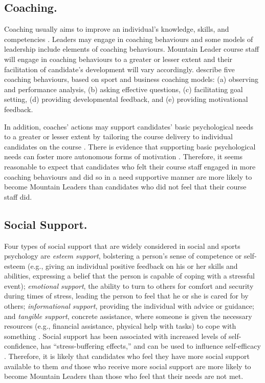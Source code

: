 \documentclass[
  12pt,
  a4paper,
]{book}
\begin{document}
\hypertarget{gen-intro-social-coaching}{%
\subsection{Coaching.}\label{gen-intro-social-coaching}}

Coaching usually aims to improve an individual's knowledge, skills, and competencies \citep{Wagstaff2018}. Leaders may engage in coaching behaviours and some models of leadership \citep[e.g., transformational leadership theory;][]{Bass1985} include elements of coaching behaviours. Mountain Leader course staff will engage in coaching behaviours to a greater or lesser extent and their facilitation of candidate's development will vary accordingly. \citet{Wagstaff2018} describe five coaching behaviours, based on sport and business coaching models: (a) observing and performance analysis, (b) asking effective questions, (c) facilitating goal setting, (d) providing developmental feedback, and (e) providing motivational feedback.

In addition, coaches' actions may support candidates' basic psychological needs to a greater or lesser extent by tailoring the course delivery to individual candidates on the course \citep{Arthur2019, Markland2010}. There is evidence that supporting basic psychological needs can foster more autonomous forms of motivation \citep{Markland2010, Silva2010}. Therefore, it seems reasonable to expect that candidates who felt their course staff engaged in more coaching behaviours and did so in a need supportive manner are more likely to become Mountain Leaders than candidates who did not feel that their course staff did.

\hypertarget{gen-intro-social-support}{%
\subsection{Social Support.}\label{gen-intro-social-support}}

Four types of social support that are widely considered in social and sports psychology are \emph{esteem support}, bolstering a person's sense of competence or self-esteem (e.g., giving an individual positive feedback on his or her skills and abilities, expressing a belief that the person is capable of coping with a stressful event); \emph{emotional support}, the ability to turn to others for comfort and security during times of stress, leading the person to feel that he or she is cared for by others; \emph{informational support}, providing the individual with advice or guidance; and \emph{tangible support}, concrete assistance, where someone is given the necessary resources (e.g., financial assistance, physical help with tasks) to cope with something \citep[e.g.,][]{Cutrona1990a, Cutrona1990b, Freeman2010, Freeman2014, Rees2007a, Rees2007}. Social support has been associated with increased levels of self-confidence, has ``stress-buffering effects,'' and can be used to influence self-efficacy \citep{Rees2007, Freeman2014, Samson2011}. Therefore, it is likely that candidates who feel they have more social support available to them \emph{and} those who receive more social support are more likely to become Mountain Leaders than those who feel that their needs are not met.
\end{document}
